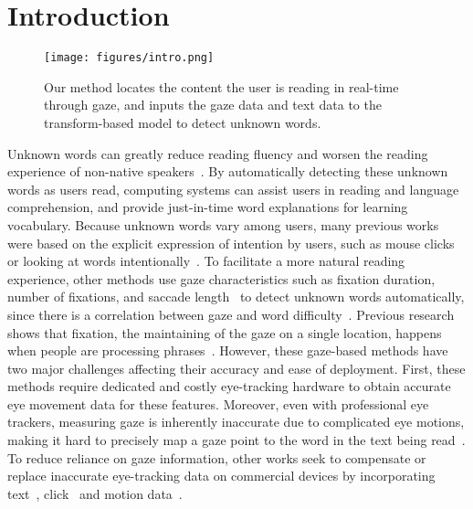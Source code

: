 
\section{Introduction}

\begin{figure*}
  \centering
  \texttt{[image: figures/intro.png]}
  \caption{Our method locates the content the user is reading in real-time through gaze, and inputs the gaze data and text data to the transform-based model to detect unknown words.}
  \label{fig:intro} 
\end{figure*}

Unknown words can greatly reduce reading fluency and worsen the reading experience of non-native speakers~\cite{rigg1991whole,mokhtar2012guessing}. By automatically detecting these unknown words as users read, computing systems can assist users in reading and language comprehension, and provide just-in-time word explanations for learning vocabulary. Because unknown words vary among users, many previous works were based on the explicit expression of intention by users, such as mouse clicks~\cite{web_ehara_2010} or looking at words intentionally~\cite{dwell_time, eye_tracking_dussias}. To facilitate a more natural reading experience, other methods use gaze characteristics such as fixation duration, number of fixations, and saccade length~\cite{sibert_reading_2000, Reading_Assistanc_Guo} to detect unknown words automatically, since there is a correlation between gaze and word difficulty~\cite{just1980theory}. Previous research shows that fixation, the maintaining of the gaze on a single location, happens when people are processing phrases~\cite{just1980theory}. However, these gaze-based methods have two major challenges affecting their accuracy and ease of deployment. First, these methods require dedicated and costly eye-tracking hardware to obtain accurate eye movement data for these features. Moreover, even with professional eye trackers, measuring gaze is inherently inaccurate due to complicated eye motions, making it hard to precisely map a gaze point to the word in the text being read~\cite{eye_mice_bates_2003}. To reduce reliance on gaze information, other works seek to compensate or replace inaccurate eye-tracking data on commercial devices by incorporating text~\cite{gaze-text_garain_2017, unknown-word_hiraoka_2016, idict2006hyrskykari, du_using_2024}, click~\cite{web_ehara_2010} and motion data~\cite{imu_higa_2022}. 

